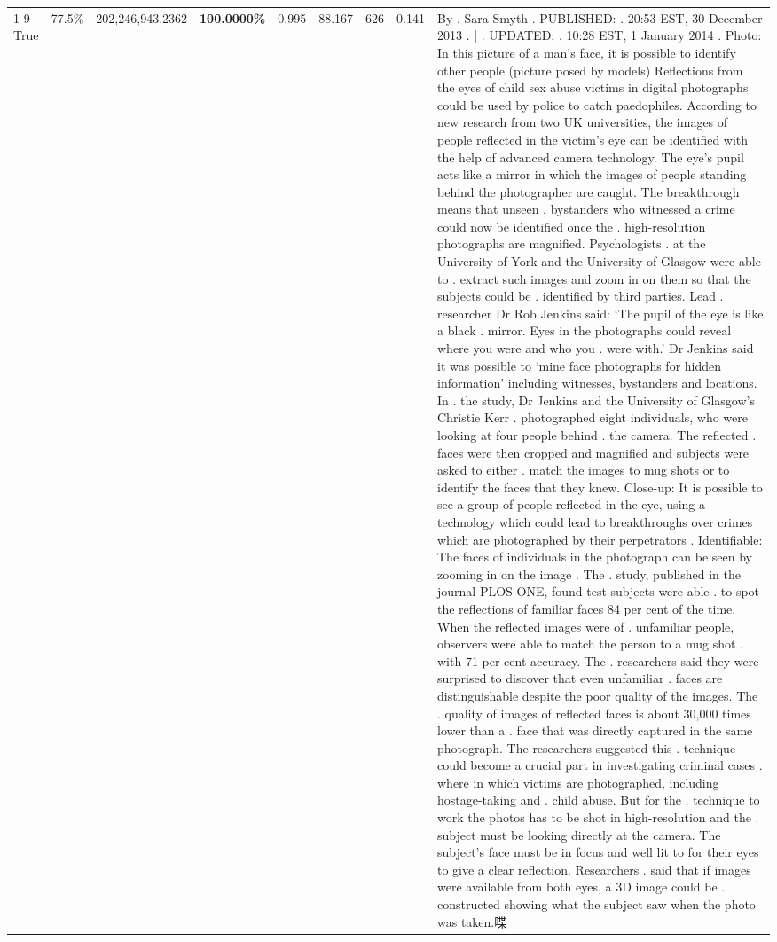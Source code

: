 \begin{table}[H]
\begin{tabular}{lllrlllll}
\cline{1-9} \cline{2-9}
True & 77.5\% & 202,246,943.2362 & \bfseries \color{red} 100.0000\% & 0.995 & 88.167 & 626 & 0.141 & By . Sara Smyth . PUBLISHED: . 20:53 EST, 30 December 2013 . | . UPDATED: . 10:28 EST, 1 January 2014 . Photo: In this picture of a man's face, it is possible to identify other people (picture posed by models) Reflections from the eyes of child sex abuse victims in digital photographs could be used by police to catch paedophiles. According to new research from two UK universities, the images of people reflected in the victim's eye can be identified with the help of advanced camera technology. The eye's pupil acts like a mirror in which the images of people standing behind the photographer are caught. The breakthrough means that unseen . bystanders who witnessed a crime could now be identified once the . high-resolution photographs are magnified. Psychologists . at the University of York and the University of Glasgow were able to . extract such images and zoom in on them so that the subjects could be . identified by third parties. Lead . researcher Dr Rob Jenkins said: ‘The pupil of the eye is like a black . mirror. Eyes in the photographs could reveal where you were and who you . were with.' Dr Jenkins said it was possible to ‘mine face photographs for hidden information' including witnesses, bystanders and locations. In . the study, Dr Jenkins and the University of Glasgow's Christie Kerr . photographed eight individuals, who were looking at four people behind . the camera. The reflected . faces were then cropped and magnified and subjects were asked to either . match the images to mug shots or to identify the faces that they knew. Close-up: It is possible to see a group of people reflected in the eye, using a technology which could lead to breakthroughs over crimes which are photographed by their perpetrators . Identifiable: The faces of individuals in the photograph can be seen by zooming in on the image . The . study, published in the journal PLOS ONE, found test subjects were able . to spot the reflections of familiar faces 84 per cent of the time. When the reflected images were of . unfamiliar people, observers were able to match the person to a mug shot . with 71 per cent accuracy. The . researchers said they were surprised to discover that even unfamiliar . faces are distinguishable despite the poor quality of the images. The . quality of images of reflected faces is about 30,000 times lower than a . face that was directly captured in the same photograph. The researchers suggested this . technique could become a crucial part in investigating criminal cases . where in which victims are photographed, including hostage-taking and . child abuse. But for the . technique to work the photos has to be shot in high-resolution and the . subject must be looking directly at the camera. The subject's face must be in focus and well lit to for their eyes to give a clear reflection. Researchers . said that if images were available from both eyes, a 3D image could be . constructed showing what the subject saw when the photo was taken.喋 \\

\end{tabular}
\end{table}
